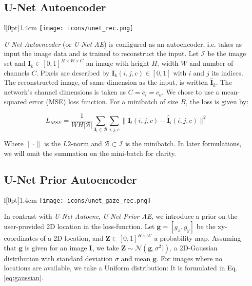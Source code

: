 \subsection{U-Net Autoencoder}
\begingroup
\setlength\intextsep{0pt}
\begin{wrapfigure}[4]{l}[0pt]{1.4cm}
\texttt{[image: icons/unet\_rec.png]}
\end{wrapfigure}

\textit{U-Net Autoencoder} (or \textit{U-Net AE}) is configured as an autoencoder, i.e.
takes as input the image data and is trained to reconstruct the input.
Let $\mathcal{I}$ be the image set and $\boldsymbol{I}_k \in [0,1]^{H \times W \times C}$ an image with height $H$, width $W$ and number of channels $C$.
Pixels are described by $\boldsymbol{I}_k(i,j,c) \in [0,1]$ with $i$ and $j$ its indices.
The reconstructed image, of same dimension as the input, is written $\boldsymbol{\hat{I}}_k$.
The network's channel dimensions is taken as $C = c_i = c_o$.
We chose to use a mean-squared error (MSE) loss function.
For a minibatch of size $B$, the loss is given by:

\begin{equation}
L_{MSE} = \frac{1}{W H |\mathcal{B}|} \sum_{\boldsymbol{I}_l \in \mathcal{B}} \sum_{i,j,c} \|\boldsymbol{I}_l(i,j,c) - \boldsymbol{\hat{I}}_l(i,j,c)\|^2
\label{eq:mse_loss}
\end{equation}
\vspace{6pt}

Where $\| \cdot \|$ is the $L2$-norm and $\mathcal{B} \subset \mathcal{I}$ is the minibatch.
In later formulations, we will omit the summation on the mini-batch for clarity.

\clearpage
\subsection{U-Net Prior Autoencoder} \label{unet_gaze_rec}
\begingroup
\setlength\intextsep{0pt}
\begin{wrapfigure}[4]{l}[0pt]{1.4cm}
\texttt{[image: icons/unet\_gaze\_rec.png]}
\end{wrapfigure}

In contrast with \textit{U-Net Autoenc}, \textit{U-Net Prior AE}, we introduce a prior on the user-provided 2D location in the loss-function.
Let $\boldsymbol{g} = [g_x, g_y]$ be the xy-coordinates of a 2D location, and  $\boldsymbol{Z} \in [0,1]^{H \times W}$ a probability map.
Assuming that $\boldsymbol{g}$ is given for an image $\boldsymbol{I}$, we take $\boldsymbol{Z} \sim \mathcal{N}(\boldsymbol{g}, \sigma^2\mathbb{I})$, a 2D-Gaussian distribution with standard deviation $\sigma$ and mean $\boldsymbol{g}$.
For images where no locations are available, we take a Uniform distribution:
It is formulated in Eq. \ref{eq:gaussian}.

